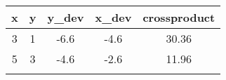 \documentclass[]{book}
\theoremstyle{definition}
\theoremstyle{definition}
\theoremstyle{definition}
\theoremstyle{remark}
\begin{document}
\begin{longtable}[]{@{}ccccc@{}}
\toprule
\begin{minipage}[b]{0.06\columnwidth}\centering\strut
x\strut
\end{minipage} & \begin{minipage}[b]{0.06\columnwidth}\centering\strut
y\strut
\end{minipage} & \begin{minipage}[b]{0.10\columnwidth}\centering\strut
y\_dev\strut
\end{minipage} & \begin{minipage}[b]{0.10\columnwidth}\centering\strut
x\_dev\strut
\end{minipage} & \begin{minipage}[b]{0.17\columnwidth}\centering\strut
crossproduct\strut
\end{minipage}\tabularnewline
\midrule
\endhead
\begin{minipage}[t]{0.06\columnwidth}\centering\strut
3\strut
\end{minipage} & \begin{minipage}[t]{0.06\columnwidth}\centering\strut
1\strut
\end{minipage} & \begin{minipage}[t]{0.10\columnwidth}\centering\strut
-6.6\strut
\end{minipage} & \begin{minipage}[t]{0.10\columnwidth}\centering\strut
-4.6\strut
\end{minipage} & \begin{minipage}[t]{0.17\columnwidth}\centering\strut
30.36\strut
\end{minipage}\tabularnewline
\begin{minipage}[t]{0.06\columnwidth}\centering\strut
5\strut
\end{minipage} & \begin{minipage}[t]{0.06\columnwidth}\centering\strut
3\strut
\end{minipage} & \begin{minipage}[t]{0.10\columnwidth}\centering\strut
-4.6\strut
\end{minipage} & \begin{minipage}[t]{0.10\columnwidth}\centering\strut
-2.6\strut
\end{minipage} & \begin{minipage}[t]{0.17\columnwidth}\centering\strut
11.96\strut
\end{minipage}\tabularnewline
\begin{minipage}[t]{0.06\columnwidth}\centering\strut

\end{minipage}
\end{longtable}
\end{document}
